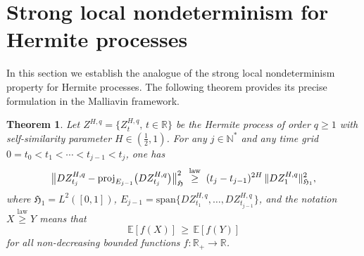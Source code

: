 \documentclass[a4paper,10pt]{article}
\theoremstyle{definition}
\theoremstyle{plain}
\newtheorem{Thm}[Def]{Theorem}
\newcommand{\R}{\mathbb{R}}
\newcommand{\N}{\mathbb{N}}
\newcommand\HHH{\mathfrak{H}}
\newcommand\1{\mathbbm{1}}
\begin{document}
\section{Strong local nondeterminism for Hermite processes}\label{sec:SLND}

In this section we establish the analogue of the strong local nondeterminism property for Hermite processes.  
The following theorem provides its precise formulation in the Malliavin framework.

\begin{Thm}\label{Thm:MLNDDiscrete}
Let $Z^{H,q}=\{Z^{H,q}_t,\,t\in\R\}$ be the Hermite process of order $q\ge1$ with self-similarity parameter $H\in(\tfrac12,1)$.  
For any $j\in\N^*$ and any time grid $0=t_0<t_1<\cdots<t_{j-1}<t_j$, one has
\begin{align}\label{9i-1}
\big\| DZ^{H,q}_{t_j} - {\rm proj}_{E_{j-1}}\big(DZ^{H,q}_{t_j}\big) \big\|_{\HHH}^2
\;\overset{\text{law}}{\ge}\; (t_j-t_{j-1})^{2H}\,\|DZ^{H,q}_1\|_{\HHH_{1}}^2,
\end{align}
where $\HHH_1=L^2([0,1])$, $E_{j-1}=\mathrm{span}\{DZ^{H,q}_{t_1},\ldots,DZ^{H,q}_{t_{j-1}}\}$, 
and the notation $X\overset{\text{law}}{\ge}Y$ means that
\[
\mathbb{E}[f(X)] \,\geq\, \mathbb{E}[f(Y)]
\]
for all non-decreasing bounded functions $f:\R_+\to\R$.
\end{Thm}
\end{document}
